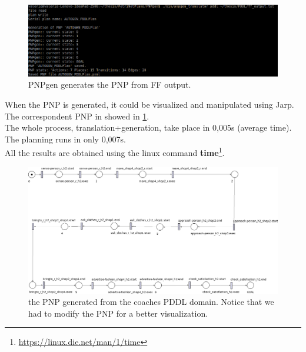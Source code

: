 \documentclass[pdftex,12pt,a4paper]{report}
\begin{document}
\begin{figure}[H]
	\centering
	\includegraphics[scale=0.4]{images/pddl_coaches.png}
	\caption{PNPgen generates the PNP from FF output.}
\end{figure}

\noindent When the PNP is generated, it could be visualized and manipulated using Jarp. The correspondent PNP in showed in \ref{fig:pddl_coaches}.\\ 
The whole process, translation+generation, take place in 0,005s (average time). The planning runs in only 0,007s.\\ All the results are obtained using the linux command \textbf{time}\footnote{\url{https://linux.die.net/man/1/time}}.  

\newpage
\begin{figure}[H]
	\centering
	\includegraphics[scale=0.48, angle=270, trim=60mm 0mm 0mm 0mm]{images/coaches_pddl.png}
	\caption{the PNP generated from the coaches PDDL domain. Notice that we had to modify the PNP for a better visualization.}
	\label{fig:pddl_coaches}
\end{figure}
\newpage
\end{document}
